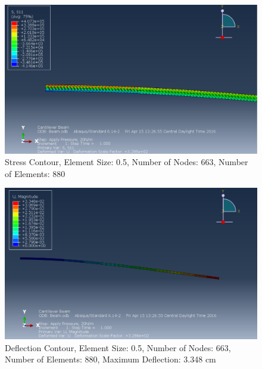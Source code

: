 \documentclass[a4paper]{article}
\begin{document}
\begin{figure}[ht]
\centering
\includegraphics[scale=.50]{3Nsize0_5StressClose.PNG}
\caption{Stress Contour, Element Size: 0.5, Number of Nodes: 663, Number of Elements: 880}
\end{figure}
\begin{figure}[ht]
\centering
\includegraphics[scale=.50]{3Nsize0_5MDisplacement.PNG}
\caption{Deflection Contour, Element Size: 0.5, Number of Nodes: 663, Number of Elements: 880, Maximum Deflection: 3.348 cm}
\end{figure}

\end{document}
